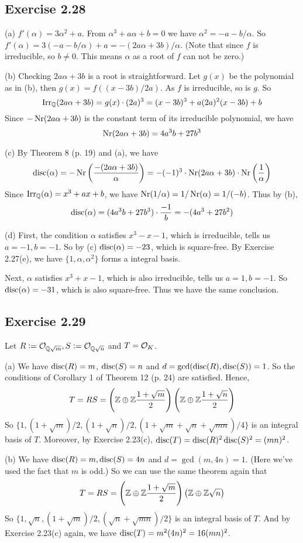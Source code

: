 \documentclass[../Marcus.tex]{subfiles}
\begin{document}
\subsection*{Exercise 2.28}

(a) $f'(\alpha)=3\alpha^2+a$. From $\alpha^3+a\alpha+b=0$ we have $\alpha^2=-a-b/\alpha$. So $f'(\alpha)=3(-a-b/\alpha)+a=-(2a\alpha+3b)/\alpha$. (Note that since $f$ is irreducible, so $b\neq 0$. This means $\alpha$ as a root of $f$ can not be zero.)

(b) Checking $2a\alpha+3b$ is a root is straightforward. Let $g(x)$ be the polynomial as in (b), then $g(x)=f((x-3b)/2a)$. As $f$ is irreducible, so is $g$. So $$\operatorname{Irr}_{\mathbb{Q}}(2a\alpha+3b)=g(x)\cdot (2a)^3=(x-3b)^3+a(2a)^2(x-3b)+b$$ Since $-\operatorname{Nr}(2a\alpha+3b)$ is the constant term of its irreducible polynomial, we have $$\operatorname{Nr}(2a\alpha+3b)=4a^3b+27b^3$$

(c) By Theorem 8 (p. 19) and (a), we have $$\operatorname{disc}(\alpha)=-\operatorname{Nr}\left(\frac{-(2a\alpha+3b)}{\alpha}\right)=-(-1)^3\cdot\operatorname{Nr}(2a\alpha+3b)\cdot\operatorname{Nr}\left(\frac{1}{\alpha}\right)$$ Since $\operatorname{Irr}_{\mathbb{Q}}(\alpha)=x^3+ax+b$, we have $\operatorname{Nr}(1/\alpha)=1/\operatorname{Nr}(\alpha)=1/(-b)$. Thus by (b), $$\operatorname{disc}(\alpha)=(4a^3b+27b^3)\cdot\frac{-1}{b}=-(4a^3+27b^2)$$

(d) First, the condition $\alpha$ satisfies $x^3-x-1$, which is irreducible, tells us $a=-1,b=-1$. So by (c) $\operatorname{disc}(\alpha)=-23$, which is square-free. By Exercise 2.27(e), we have $\{1,\alpha,\alpha^2\}$ forms a integral basis.

Next, $\alpha$ satisfies $x^3+x-1$, which is also irreducible, tells us $a=1,b=-1$. So $\operatorname{disc}(\alpha)=-31$, which is also square-free. Thus we have the same conclusion.

\subsection*{Exercise 2.29}

Let $R:=\mathcal{O}_{\mathbb{Q}\sqrt{m}},S:=\mathcal{O}_{\mathbb{Q}\sqrt{n}}$ and $T=\mathcal{O}_K$. 

(a) We have $\operatorname{disc}(R)=m$, $\operatorname{disc}(S)=n$ and $d=\gcd(\operatorname{disc}(R),\operatorname{disc}(S))=1$. So the conditions of Corollary 1 of Theorem 12 (p. 24) are satisfied. Hence, $$T=RS=\left(\mathbb{Z}\oplus\mathbb{Z}\frac{1+\sqrt{m}}{2}\right)\left(\mathbb{Z}\oplus\mathbb{Z}\frac{1+\sqrt{n}}{2}\right)$$ So $\{1,(1+\sqrt{m})/2,(1+\sqrt{n})/2,(1+\sqrt{m}+\sqrt{n}+\sqrt{mn})/4\}$ is an integral basis of $T$. Moreover, by Exercise 2.23(c), $\operatorname{disc}(T)=\operatorname{disc}(R)^2\operatorname{disc}(S)^2=(mn)^2$.  

(b) We have $\operatorname{disc}(R)=m,\operatorname{disc}(S)=4n$ and $d=\gcd(m,4n)=1$. (Here we've used the fact that $m$ is odd.) So we can use the same theorem again that
$$T=RS=\left(\mathbb{Z}\oplus\mathbb{Z}\frac{1+\sqrt{m}}{2}\right)\left(\mathbb{Z}\oplus\mathbb{Z}\sqrt{n}\right)$$ So $\{1,\sqrt{n},(1+\sqrt{m})/2,(\sqrt{n}+\sqrt{mn})/2\}$ is an integral basis of $T$. And by Exercise 2.23(c) again, we have $\operatorname{disc}(T)=m^2(4n)^2=16(mn)^2$.
\end{document}
